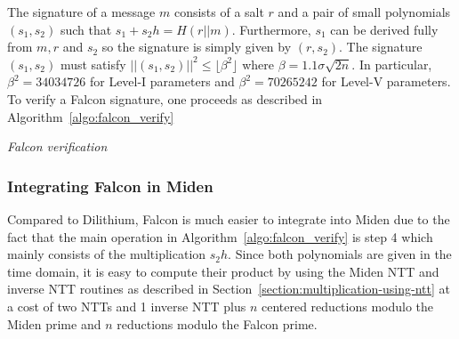 The signature of a message $m$ consists of a salt $r$ and a pair of small polynomials $(s_1, s_2)$ such that 
$s_1 + s_2 h = H(r || m)$.  Furthermore, $s_1$ can be derived fully from $m , r$ and $s_2$ so the signature
is simply given by $(r, s_2)$.  The signature $(s_1,s_2)$ must satisfy $||(s_1,s_2)||^2 \leq \lfloor \beta^2 \rfloor$ where
$\beta = 1.1 \sigma \sqrt{2n}$.  In particular, $\beta^2 = 34034726$ for Level-I parameters and $\beta^2 = 70265242$
for Level-V parameters.  To verify a Falcon signature, one proceeds as described in Algorithm~\ref{algo:falcon_verify}

\begin{algorithm}[!ht] \label{algo:falcon_verify}
\begin{scriptsize}
\caption{\emph{Falcon verification}}
\end{scriptsize}
\end{algorithm} 

\subsubsection*{Integrating Falcon in Miden} Compared to Dilithium, Falcon is much easier to integrate into Miden due
to the fact that the main operation in Algorithm~\ref{algo:falcon_verify} is step 4 which mainly consists of the multiplication 
$s_2 h$.  Since both polynomials are given in the time domain, it is easy to compute their product by using the Miden 
NTT and inverse NTT routines as described in Section~\ref{section:multiplication-using-ntt} at a cost 
of two NTTs and 1 inverse NTT plus $n$ centered reductions modulo the Miden prime and $n$ reductions
modulo the Falcon prime.








